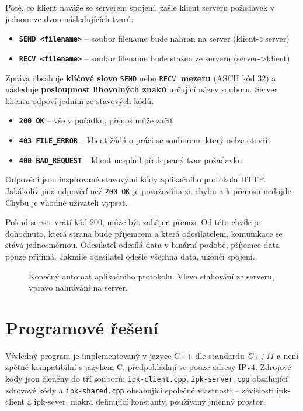 \documentclass[11pt,a4paper]{article}
\begin{document}
Poté, co klient naváže se serverem spojení, zašle klient serveru požadavek v jednom ze dvou následujících tvarů:
\begin{itemize}
	\item \texttt{\textbf{SEND <filename>}} -- soubor filename bude nahrán na server (klient->server)
	\item \texttt{\textbf{RECV <filename>}} -- soubor filename bude stažen ze serveru (server->klient)
\end{itemize}
Zpráva obsahuje \textbf{klíčové slovo} \texttt{SEND} nebo \texttt{RECV}, \textbf{mezeru} (ASCII kód 32) a následuje \textbf{posloupnost libovolných znaků} určující název souboru. Server klientu odpoví jedním ze stavových kódů:
\begin{itemize}
	\item \texttt{\textbf{200 OK}} -- vše v pořádku, přenos může začít
	\item \texttt{\textbf{403 FILE\_ERROR}} -- klient žádá o práci se souborem, který nelze otevřít
	\item \texttt{\textbf{400 BAD\_REQUEST}} -- klient nesplnil předepsaný tvar požadavku
\end{itemize}
Odpovědi jsou inspirované stavovými kódy aplikačního protokolu HTTP. Jakákoliv jiná odpověď než \texttt{200 OK} je považována za chybu a k přenosu nedojde. Chybu je vhodné uživateli vypsat.

Pokud server vrátí kód 200, může být zahájen přenos. Od této chvíle je dohodnuto, která strana bude příjemcem a která odesílatelem, komunikace se stává jednosměrnou. Odesílatel odesílá data v binární podobě, příjemce data pouze přijímá. Jakmile odesílatel odešle všechna data, ukončí spojení.
\begin{figure}[H]
	\centering
	\caption{Konečný automat aplikačního protokolu. Vlevo stahování ze serveru, vpravo nahrávání na server.}
	\label{fsm}
\end{figure}

\section{Programové řešení}
Výsledný program je implementovaný v jazyce C++ dle standardu \textit{C++11} a není zpětně kompatibilní s jazykem C, předpokládají se pouze adresy IPv4.
Zdrojové kódy jsou členěny do tří souborů: \texttt{ipk-client.cpp}, \texttt{ipk-server.cpp} obsahující zdrovové kódy a \texttt{ipk-shared.cpp} obsahující společné vlastnosti -- závislosti ipk-client a ipk-sever, makra definující konstanty, používaný jmenný prostor.
\end{document}
